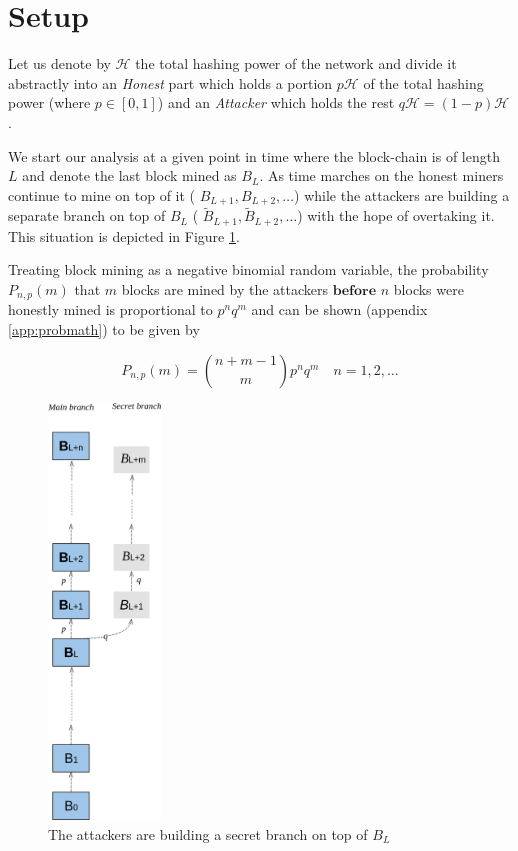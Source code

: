 \documentclass[letterpaper,12pt]{report}
\theoremstyle{plain}
\theoremstyle{definition}
\begin{document}
\section{Setup}\label{calcsetup}
Let us denote by $\mathcal{H}$ the total hashing power of the network and divide it abstractly into an \emph{Honest} part which holds a portion $p\mathcal{H}$ of the total hashing power (where $p \in [0,1]$) and an \emph{Attacker} which holds the rest $q\mathcal{H}=(1-p)\mathcal{H}$. 

We start our analysis at a given point in time where the block-chain is of length $L$ and denote the last block mined as $\mathit{B}_L$. As time marches on the honest miners continue to mine on top of it ( $\mathit{B}_{L+1}, \mathit{B}_{L+2}, \dots$) while the attackers are building a separate branch on top of $\mathit{B}_L$ ( $\mathit{\tilde{B}}_{L+1}, \mathit{\tilde{B}}_{L+2}, \dots$) with the hope of overtaking it. This situation is depicted in Figure \ref{fig:secretbranch}.

Treating block mining as a negative binomial random variable, the probability $\mathit{P_{n,p}(m)}$ that $m$ blocks are mined by the attackers $\mathbf{before}$ $n$ blocks were honestly mined is proportional to $p^nq^m$ and can be shown
(appendix \ref{app:probmath}) to be given by

\begin{equation}\label{eq:pnm}
\mathit{P}_{n,p}(m)={n + m -1\choose m}p^nq^m \quad n=1,2,\dots
\end{equation}

\begin{figure}[pos]
\centering
\includegraphics[width=30mm]{Blockwithholding.png}
\caption{The attackers are building a secret branch on top of $\mathit{B}_L$}
\label{fig:secretbranch}
\end{figure}
\end{document}
